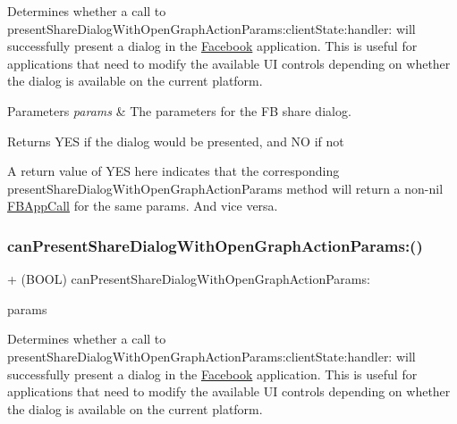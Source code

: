 Determines whether a call to present\+Share\+Dialog\+With\+Open\+Graph\+Action\+Params\+:client\+State\+:handler\+: will successfully present a dialog in the \hyperlink{interfaceFacebook}{Facebook} application. This is useful for applications that need to modify the available UI controls depending on whether the dialog is available on the current platform.


\begin{DoxyParams}{Parameters}
{\em params} & The parameters for the FB share dialog.\\
\hline
\end{DoxyParams}
\begin{DoxyReturn}{Returns}
Y\+ES if the dialog would be presented, and NO if not
\end{DoxyReturn}
A return value of Y\+ES here indicates that the corresponding present\+Share\+Dialog\+With\+Open\+Graph\+Action\+Params method will return a non-\/nil \hyperlink{interfaceFBAppCall}{F\+B\+App\+Call} for the same params. And vice versa. \mbox{\label{interfaceFBDialogs_ad8921a3906d28210cad0c0871e99f4bd}} 
\subsubsection{\texorpdfstring{can\+Present\+Share\+Dialog\+With\+Open\+Graph\+Action\+Params\+:()}{canPresentShareDialogWithOpenGraphActionParams:()}\hspace{0.1cm}{\footnotesize\ttfamily [2/5]}}
{\footnotesize\ttfamily + (B\+O\+OL) can\+Present\+Share\+Dialog\+With\+Open\+Graph\+Action\+Params\+: \begin{DoxyParamCaption}\item[{(\hyperlink{interfaceFBOpenGraphActionParams}{F\+B\+Open\+Graph\+Action\+Params} $\ast$)}]{params }\end{DoxyParamCaption}}

Determines whether a call to present\+Share\+Dialog\+With\+Open\+Graph\+Action\+Params\+:client\+State\+:handler\+: will successfully present a dialog in the \hyperlink{interfaceFacebook}{Facebook} application. This is useful for applications that need to modify the available UI controls depending on whether the dialog is available on the current platform.


